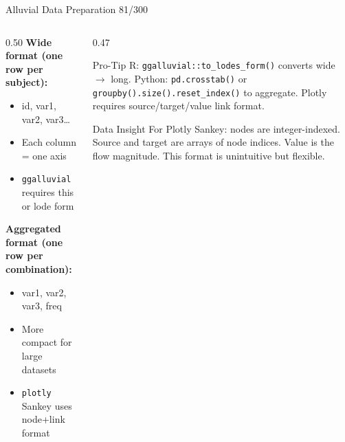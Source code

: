 \documentclass[10pt]{beamer}
\newcommand{\smark}[1]{\hfill{\scriptsize\color{codegray}#1}}
\begin{document}
\begin{frame}{Alluvial Data Preparation}
\smark{81/300}
\begin{columns}[T]
\begin{column}{0.50\textwidth}
    \textbf{Wide format (one row per subject):}
    \begin{itemize}
        \item id, var1, var2, var3\ldots
        \item Each column = one axis
        \item \texttt{ggalluvial} requires this or lode form
    \end{itemize}
    \vspace{0.2cm}
    \textbf{Aggregated format (one row per combination):}
    \begin{itemize}
        \item var1, var2, var3, freq
        \item More compact for large datasets
        \item \texttt{plotly} Sankey uses node+link format
    \end{itemize}
\end{column}
\begin{column}{0.47\textwidth}
\begin{alertblock}{Pro-Tip}
    \scriptsize R: \texttt{ggalluvial::to\_lodes\_form()} converts wide $\to$ long. Python: \texttt{pd.crosstab()} or \texttt{groupby().size().reset\_index()} to aggregate. Plotly requires source/target/value link format.
\end{alertblock}
\vspace{0.1cm}
\begin{exampleblock}{Data Insight}
    \scriptsize For Plotly Sankey: nodes are integer-indexed. Source and target are arrays of node indices. Value is the flow magnitude. This format is unintuitive but flexible.
\end{exampleblock}
\end{column}
\end{columns}
\end{frame}
\end{document}
